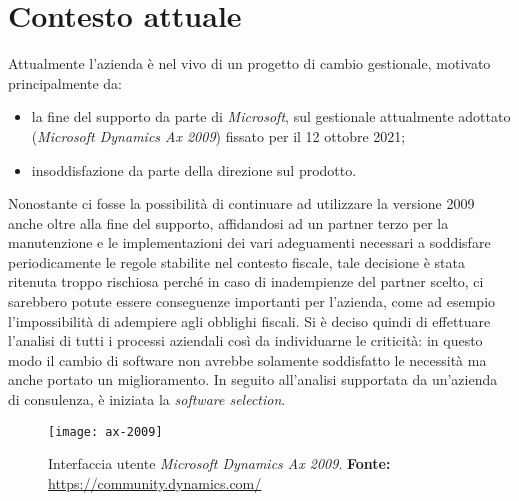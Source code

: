 \section{Contesto attuale}

Attualmente l'azienda è nel vivo di un progetto di cambio gestionale, motivato principalmente da:
\begin{itemize}
	\item la fine del supporto da parte di \textit{Microsoft}, sul gestionale attualmente adottato (\textit{Microsoft Dynamics Ax 2009}) fissato per il 12 ottobre 2021;
	\item insoddisfazione da parte della direzione sul prodotto.
\end{itemize}
Nonostante ci fosse la possibilità di continuare ad utilizzare la versione 2009 anche oltre alla fine del supporto, affidandosi ad un partner terzo per la manutenzione e le implementazioni dei vari adeguamenti necessari a soddisfare periodicamente le regole stabilite nel contesto fiscale, tale decisione è stata ritenuta troppo rischiosa perché in caso di inadempienze del partner scelto, ci sarebbero potute essere conseguenze importanti per l'azienda, come ad esempio l'impossibilità di adempiere agli obblighi fiscali.
Si è deciso quindi di effettuare l'analisi di tutti i processi aziendali così da individuarne le criticità: in questo modo il cambio di software non avrebbe solamente soddisfatto le necessità ma anche portato un miglioramento. In seguito all'analisi supportata da un'azienda di consulenza, è iniziata la \textit{software selection}.

\vspace{10pt}
\begin{figure}[htbp]
	\begin{center}
		\texttt{[image: ax-2009]}
		\caption{Interfaccia utente \textit{Microsoft Dynamics Ax 2009}. \newline \textbf{Fonte: }\url{https://community.dynamics.com/}}
	\end{center}
\end{figure}
\vspace{10pt}

